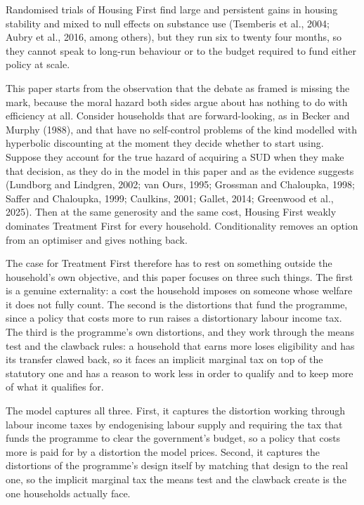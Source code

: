 \documentclass[10pt]{article}
\begin{document}
Randomised trials of Housing First find
large and persistent gains in housing stability and mixed to null effects on substance
use (Tsemberis et al., 2004; Aubry et al., 2016, among others), but they run six to twenty four months, so they cannot
speak to long-run behaviour or to the budget required to fund either policy at
scale.

This paper starts from the observation that the debate as framed is
missing the mark, because the moral hazard both sides argue about has nothing
to do with efficiency at all. Consider households that are forward-looking, as in Becker and
Murphy (1988), and that have no self-control problems of the kind modelled with
hyperbolic discounting at the moment they decide whether to start using. Suppose
they account for the true hazard of acquiring a SUD when
they make that decision, as they do in the model in this paper
and as the evidence suggests (Lundborg and Lindgren, 2002; van Ours, 1995; Grossman
and Chaloupka, 1998; Saffer and Chaloupka, 1999; Caulkins, 2001; Gallet, 2014;
Greenwood et al., 2025). Then at the same generosity and the same cost, Housing First
weakly dominates Treatment First for every household. Conditionality removes an
option from an optimiser and gives nothing back.



The case for Treatment First therefore has to rest on something outside the
household's own objective, and this paper focuses on three such things.
The first is a genuine externality: a cost the household imposes on someone whose
welfare it does not fully count. The second is the distortions that fund the
programme, since a policy that costs more to run raises a distortionary labour income tax.
The third is the programme's own distortions, and they work through the means test and
the clawback rules: a
household that earns more loses eligibility and has its transfer clawed back, so it
faces an implicit marginal tax on top of the statutory one and has a reason to work
less in order to qualify and to keep more of what it qualifies for.

The model captures all three. First, it captures the distortion working through
labour income taxes by endogenising labour supply and requiring the tax that funds the
programme to clear the government's budget, so a policy that costs more is paid for by
a distortion the model prices. Second, it captures the
distortions of the programme's design itself by matching that design to the real one,
so the implicit marginal tax the means test and the clawback create is the one
households actually face.
\end{document}
